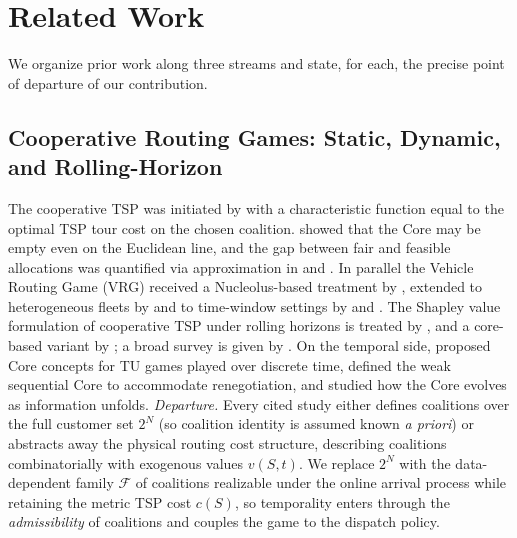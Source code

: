 \documentclass[11pt]{article}
\theoremstyle{plain}
\theoremstyle{definition}
\theoremstyle{remark}
\newcommand{\F}{\mathcal{F}}
\begin{document}
\section{Related Work}
\label{sec:related}

We organize prior work along three streams and state, for each, the precise point of departure of our contribution.

\subsection{Cooperative Routing Games: Static, Dynamic, and Rolling-Horizon}
The cooperative TSP was initiated by \citet{potters1992tsg} with a characteristic function equal to the optimal TSP tour cost on the chosen coalition. \citet{tamir1989core} showed that the Core may be empty even on the Euclidean line, and the gap between fair and feasible allocations was quantified via approximation in \citet{faigle1998approximate} and \citet{blaser2008metric}. In parallel the Vehicle Routing Game (VRG) received a Nucleolus-based treatment by \citet{gothe1996vrg}, extended to heterogeneous fleets by \citet{engevall2004heterogeneous} and to time-window settings by \citet{tae2020vrgtw} and \citet{arroyo2024vrptw}. The Shapley value formulation of cooperative TSP under rolling horizons is treated by \citet{kimms2016rolling}, and a core-based variant by \citet{kimms2016core}; a broad survey is given by \citet{guajardo2016review}. On the temporal side, \citet{kranich2005dynamic} proposed Core concepts for TU games played over discrete time, \citet{habis2010weak} defined the weak sequential Core to accommodate renegotiation, and \citet{lehrer2013dynamic} studied how the Core evolves as information unfolds. \emph{Departure.} Every cited study either defines coalitions over the full customer set $2^N$ (so coalition identity is assumed known \emph{a priori}) or abstracts away the physical routing cost structure, describing coalitions combinatorially with exogenous values $v(S,t)$. We replace $2^N$ with the data-dependent family $\F$ of coalitions realizable under the online arrival process while retaining the metric TSP cost $c(S)$, so temporality enters through the \emph{admissibility} of coalitions and couples the game to the dispatch policy.
\end{document}
